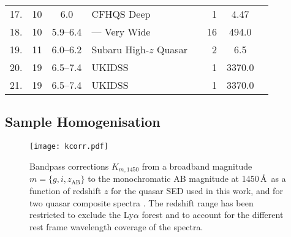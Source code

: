 \documentclass[a4paper,fleqn,usenatbib]{mnras}
\begin{document}
\begin{table*}
\begin{tabular}{crcllrSl}
    17. & 10 & 6.0 & CFHQS Deep & \citet{2010AJ....139..906W} & 1 & 4.47 & \\
    18. & 10 & 5.9--6.4 & --- Very Wide & \citet{2010AJ....139..906W} & 16 & 494.0 & \\
    19. & 11 & 6.0--6.2 & Subaru High-$z$ Quasar & \citet{2015ApJ...798...28K} & 2 & 6.5 & \\
    20. & 19 & 6.5--7.4 & UKIDSS & \citet{2011Natur.474..616M} & 1 & 3370.0 & \\
    21. & 19 & 6.5--7.4 & UKIDSS & \citet{2007MNRAS.376L..76V} & 1 & 3370.0 & \\
  \end{tabular}
\end{table*}

\subsection{Sample Homogenisation}
\label{sect:datahom}

\begin{figure}
    \texttt{[image: kcorr.pdf]}
  \caption{Bandpass corrections $K_{m,1450}$ from a broadband magnitude $m=\{g,i,z_\mathrm{AB}\}$
           to the monochromatic AB magnitude at 1450\,\AA\ as a function of redshift $z$ for the \citet{2015MNRAS.449.4204L}
           quasar SED used in this work, and for two quasar composite spectra \citep{2001AJ....122..549V, 2002ApJ...565..773T}.
           The redshift range has been restricted to exclude the Ly$\alpha$ forest and to account for the different
           rest frame wavelength coverage of the spectra.}
  \label{fig:kcorr}
\end{figure}
\end{document}
